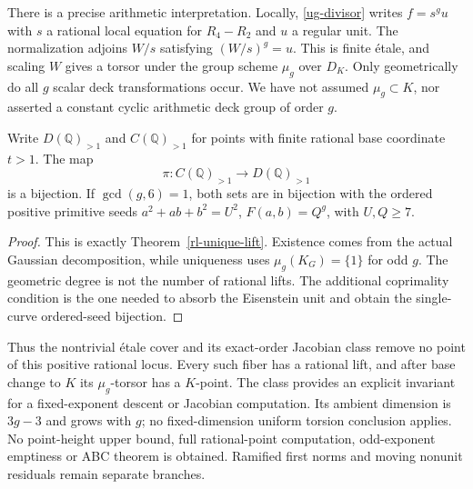 There is a precise arithmetic interpretation. Locally,
\eqref{ug-divisor} writes $f=s^g u$ with $s$ a rational local
equation for $R_4-R_2$ and $u$ a regular unit. The normalization
adjoins $W/s$ satisfying $(W/s)^g=u$. This is finite \'etale,
and scaling $W$ gives a torsor under the group scheme $\mu_g$
over $D_K$. Only geometrically do all $g$ scalar deck
transformations occur. We have not assumed $\mu_g\subset K$,
nor asserted a constant cyclic arithmetic deck group of order $g$.

\begin{corollary}\label{ug-positive}
Write $D(\mathbb Q)_{>1}$ and $C(\mathbb Q)_{>1}$ for points with
finite rational base coordinate $t>1$. The map
\[
 \pi:C(\mathbb Q)_{>1}\longrightarrow D(\mathbb Q)_{>1}
\]
is a bijection. If $\gcd(g,6)=1$, both sets are in bijection with
the ordered positive primitive seeds
$a^2+ab+b^2=U^2$, $F(a,b)=Q^g$, with $U,Q\geq7$.
\end{corollary}
\begin{proof}
This is exactly Theorem~\ref{rl-unique-lift}. Existence comes from
the actual Gaussian decomposition, while uniqueness uses
$\mu_g(K_G)=\{1\}$ for odd $g$. The geometric degree is not the
number of rational lifts. The additional coprimality condition is
the one needed to absorb the Eisenstein unit and obtain the
single-curve ordered-seed bijection.
\end{proof}

Thus the nontrivial \'etale cover and its exact-order Jacobian
class remove no point of this positive rational locus. Every
such fiber has a rational lift, and after base change to $K$
its $\mu_g$-torsor has a $K$-point. The class provides an explicit
invariant for a fixed-exponent descent or Jacobian computation.
Its ambient dimension is $3g-3$ and grows with $g$; no
fixed-dimension uniform torsion conclusion applies.
No point-height upper bound, full rational-point computation,
odd-exponent emptiness or ABC theorem is obtained. Ramified
first norms and moving nonunit residuals remain separate branches.
